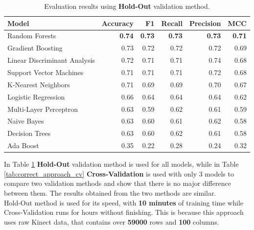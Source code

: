                 \begin{table}[htbp]
                    \centering
                    \begin{tabular}{lrrrrr}
                        \toprule
                        \textbf{Model} & \textbf{Accuracy} & \textbf{F1} & \textbf{Recall} & \textbf{Precision} & \textbf{MCC} \\
                        \midrule
                        Random Forests & \textbf{0.74} & \textbf{0.73} & \textbf{0.73} & \textbf{0.73} & \textbf{0.71} \\
                        Gradient Boosting & 0.73 & 0.72 & 0.72 & 0.72 & 0.69 \\
                        Linear Discriminant Analysis & 0.72 & 0.71 & 0.71 & 0.74 & 0.68 \\
                        Support Vector Machines & 0.71 & 0.71 & 0.71 & 0.72 & 0.68 \\
                        K-Nearest Neighbors & 0.71 & 0.69 & 0.69 & 0.70 & 0.67 \\
                        Logistic Regression & 0.66 & 0.64 & 0.64 & 0.64 & 0.62 \\
                        Multi-Layer Perceptron & 0.63 & 0.59 & 0.62 & 0.61 & 0.59 \\
                        Naive Bayes & 0.63 & 0.60 & 0.61 & 0.62 & 0.58 \\
                        Decision Trees & 0.63 & 0.60 & 0.62 & 0.61 & 0.58 \\
                        Ada Boost & 0.35 & 0.22 & 0.28 & 0.24 & 0.32 \\
                        \bottomrule
                    \end{tabular}
                    \caption{Evaluation results using \textbf{Hold-Out} validation method.}
                    \label{tab:correct_approach_holdout}
                \end{table}

                In Table \ref{tab:correct_approach_holdout} \textbf{Hold-Out} validation method is used for all models, while in Table \ref{tab:correct_approach_cv} \textbf{Cross-Validation} is used with only 3 models to compare two validation methods and show that there is no major difference between them. The results obtained from the two methods are similar. \\

                Hold-Out method is used for its speed, with \textbf{10 minutes} of training time while Cross-Validation runs for hours without finishing. This is because this approach uses raw Kinect data, that contains over \textbf{59000} rows and \textbf{100} columns. 
                
